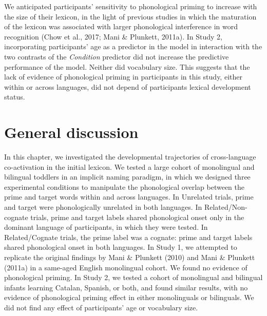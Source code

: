 \documentclass[
  12pt,
  b5paperpaper,
  twoside]{scrreprt}
\begin{document}
We anticipated participants' sensitivity to phonological priming to
increase with the size of their lexicon, in the light of previous
studies in which the maturation of the lexicon was associated with
larger phonological interference in word recognition (Chow et al., 2017;
Mani \& Plunkett, 2011a). In Study 2, incorporating participants' age as
a predictor in the model in interaction with the two contrasts of the
\emph{Condition} predictor did not increase the predictive performance
of the model. Neither did vocabulary size. This suggests that the lack
of evidence of phonological priming in participants in this study,
either within or across languages, did not depend of participants
lexical development status.

\hypertarget{general-discussion}{%
\section{General discussion}\label{general-discussion}}

In this chapter, we investigated the developmental trajectories of
cross-language co-activation in the initial lexicon. We tested a large
cohort of monolingual and bilingual toddlers in an implicit naming
paradigm, in which we designed three experimental conditions to
manipulate the phonological overlap between the prime and target words
within and across languages. In Unrelated trials, prime and target were
phonologically unrelated in both languages. In Related/Non-cognate
trials, prime and target labels shared phonological onset only in the
dominant language of participants, in which they were tested. In
Related/Cognate trials, the prime label was a cognate: prime and target
labels shared phonological onset in both languages. In Study 1, we
attempted to replicate the original findings by Mani \& Plunkett (2010)
and Mani \& Plunkett (2011a) in a same-aged English monolingual cohort.
We found no evidence of phonological priming. In Study 2, we tested a
cohort of monolingual and bilingual infants learning Catalan, Spanish,
or both, and found similar results, with no evidence of phonological
priming effect in either monolinguals or bilinguals. We did not find any
effect of participants' age or vocabulary size.
\end{document}
